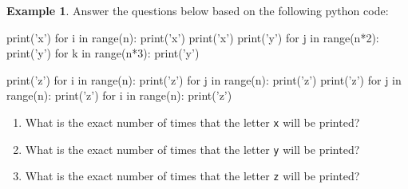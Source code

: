 \documentclass[10pt]{article}
\theoremstyle{definition}
\newtheorem{example}{Example}
\begin{document}
\newpage
\begin{example}
Answer the questions below based on the following python code:
\begin{python}
print('x')
for i in range(n):
    print('x')
    print('x')
    print('y')
    for j in range(n*2):
        print('y')
        for k in range(n*3):
            print('y')

print('z')
for i in range(n):
    print('z')
    for j in range(n):
        print('z')
        print('z')
    for j in range(n):
        print('z')
for i in range(n):
    print('z')
\end{python}
    \begin{enumerate}
        \item What is the exact number of times that the letter \texttt{x} will be printed?
            \vspace{1.5in}
        \item What is the exact number of times that the letter \texttt{y} will be printed?
            \vspace{1.5in}
        \item What is the exact number of times that the letter \texttt{z} will be printed?
    \end{enumerate}
\end{example}
\end{document}
